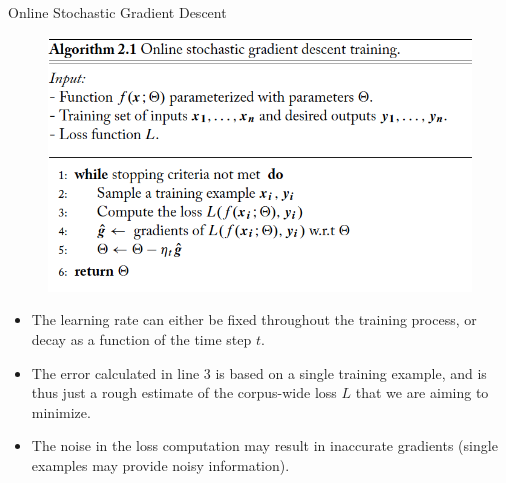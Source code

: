 \begin{frame}{Online Stochastic Gradient Descent}


\begin{figure}[htb]
	\centering
	 \includegraphics[scale=0.3]{pics/Online-SGD.png}
\end{figure}

\begin{scriptsize}
\begin{itemize}
\item The learning rate can either be fixed throughout the
training process, or decay as a function of the time step $t$.
\item  The error calculated in line 3 is based on a single training example, and is thus just a rough estimate of the corpus-wide loss $L$ that we are aiming to minimize. 
\item The noise in the loss computation may result in inaccurate gradients (single examples may provide noisy information).

\end{itemize}


\end{scriptsize}


\end{frame}


